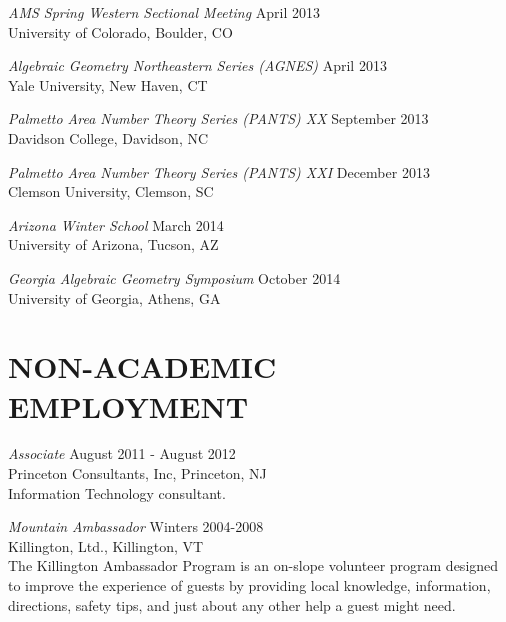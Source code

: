 \documentclass[line,margin]{res}
\begin{document}
\begin{resume}
                          {\sl AMS Spring Western Sectional Meeting} \hfill April 2013\\
                          University of Colorado, Boulder, CO
                          
                          {\sl Algebraic Geometry Northeastern Series (AGNES)} \hfill April 2013\\
                          Yale University, New Haven, CT

                          \newpage
                          
                          {\sl Palmetto Area Number Theory Series (PANTS) XX} \hfill September 2013\\
                          Davidson College, Davidson, NC
                          
                          {\sl Palmetto Area Number Theory Series (PANTS) XXI} \hfill December 2013\\
                          Clemson University, Clemson, SC

                          {\sl Arizona Winter School} \hfill March 2014\\
                          University of Arizona, Tucson, AZ
                          
                          {\sl Georgia Algebraic Geometry Symposium} \hfill October 2014\\
                          University of Georgia, Athens, GA
                          
                          \section{NON-ACADEMIC\\EMPLOYMENT}             
                                  {\sl Associate} \hfill August 2011 - August 2012\\
                                  Princeton Consultants, Inc, Princeton, NJ\\
                                  Information Technology consultant.

                                  {\it Mountain Ambassador} \hfill Winters 2004-2008\\
                                  Killington, Ltd., Killington, VT \\
                                  The Killington Ambassador Program is an on-slope volunteer program
                                  designed to improve the experience of guests by providing local knowledge, 
                                  information, directions, safety tips, and just about any other help a guest might need.


\end{resume}
\end{document}
